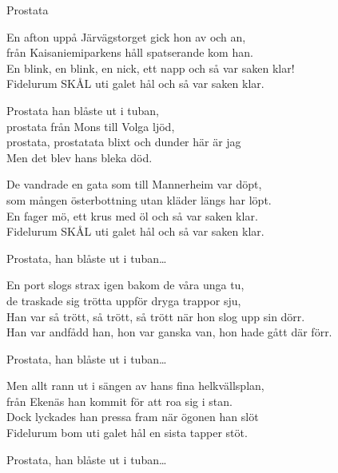 \begin{song}{Prostata}


    
    \showversenumber	
	En afton uppå Järvägstorget gick hon av och an,\\
	från Kaisaniemiparkens håll spatserande kom han.\\
	En blink, en blink, en nick, ett napp och så var saken klar!\\
	Fidelurum SKÅL uti galet hål och så var saken klar.
	
	\vspace{-.1cm}
	Prostata han blåste ut i tuban,\\
	prostata från Mons till Volga ljöd,\\
	prostata, prostatata blixt och dunder här är jag\\
	Men det blev hans bleka död.
	
	\showversenumber
	De vandrade en gata som till Mannerheim var döpt,\\
	som mången österbottning utan kläder längs har löpt.\\
	En fager mö, ett krus med öl och så var saken klar.\\
	Fidelurum SKÅL uti galet hål och så var saken klar.

	\vspace{-.1cm}
	Prostata, han blåste ut i tuban\ldots

	\showversenumber
	En port slogs strax igen bakom de våra unga tu,\\
	de traskade sig trötta uppför dryga trappor sju,\\
	Han var så trött, så trött, så trött när hon slog upp sin dörr.\\
	Han var andfådd han, hon var ganska van, hon hade gått där förr.

	\vspace{-.1cm}
	Prostata, han blåste ut i tuban\ldots
	
	\showversenumber
	Men allt rann ut i sängen av hans fina helkvällsplan,\\
	från Ekenäs han kommit för att roa sig i stan.\\
	Dock lyckades han pressa fram när ögonen han slöt\\
	Fidelurum bom uti galet hål en sista tapper stöt.

	\vspace{-.1cm}
	Prostata, han blåste ut i tuban\ldots
	
\end{song}
